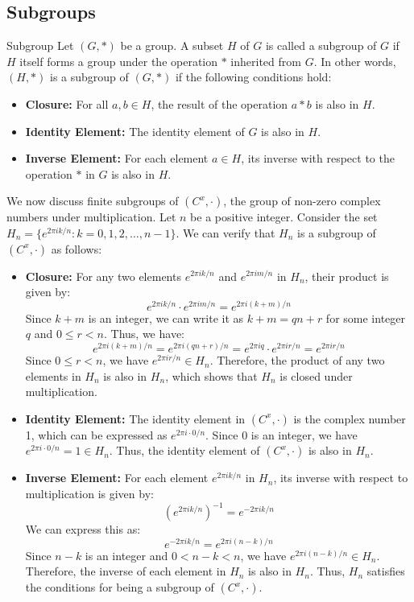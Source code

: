 \documentclass[openany]{book}
\begin{document}
\subsection{Subgroups}
\begin{mydefinition}{Subgroup}
    Let $(G, *)$ be a group. A subset $H$ of $G$ is called a subgroup of $G$ if $H$ itself forms a group under the operation $*$ inherited from $G$. In other words, $(H, *)$ is a subgroup of $(G, *)$ if the following conditions hold:
    \begin{itemize}
        \item \textbf{Closure:} For all $a, b \in H$, the result of the operation $a * b$ is also in $H$.
        \item \textbf{Identity Element:} The identity element of $G$ is also in $H$.
        \item \textbf{Inverse Element:} For each element $a \in H$, its inverse with respect to the operation $*$ in $G$ is also in $H$.
    \end{itemize}
\end{mydefinition}
We now discuss finite subgroups of $(C^x, \cdot)$, the group of non-zero complex numbers under multiplication. Let $n$ be a positive integer. Consider the set $H_n = \{ e^{2\pi i k/n} : k = 0, 1, 2, \ldots, n-1 \}$. We can verify that $H_n$ is a subgroup of $(C^x, \cdot)$ as follows:
\begin{itemize}
    \item \textbf{Closure:} For any two elements $e^{2\pi i k/n}$ and $e^{2\pi i m/n}$ in $H_n$, their product is given by:
    \[
    e^{2\pi i k/n} \cdot e^{2\pi i m/n} = e^{2\pi i (k+m)/n}
    \]
    Since $k+m$ is an integer, we can write it as $k+m = qn + r$ for some integer $q$ and $0 \leq r < n$. Thus, we have:
    \[
    e^{2\pi i (k+m)/n} = e^{2\pi i (qn + r)/n} = e^{2\pi i q} \cdot e^{2\pi i r/n} = e^{2\pi i r/n}
    \]
    Since $0 \leq r < n$, we have $e^{2\pi i r/n} \in H_n$. Therefore, the product of any two elements in $H_n$ is also in $H_n$, which shows that $H_n$ is closed under multiplication.
    \item \textbf{Identity Element:} The identity element in $(C^x, \cdot)$ is the complex number 1, which can be expressed as $e^{2\pi i \cdot 0/n}$. Since $0$ is an integer, we have $e^{2\pi i \cdot 0/n} = 1 \in H_n$. Thus, the identity element of $(C^x, \cdot)$ is also in $H_n$.
    \item \textbf{Inverse Element:} For each element $e^{2\pi i k/n}$ in $H_n$, its inverse with respect to multiplication is given by:
    \[
    (e^{2\pi i k/n})^{-1} = e^{-2\pi i k/n}
    \]
    We can express this as:
    \[
    e^{-2\pi i k/n} = e^{2\pi i (n-k)/n}
    \]
    Since $n-k$ is an integer and $0 < n-k < n$, we have $e^{2\pi i (n-k)/n} \in H_n$. Therefore, the inverse of each element in $H_n$ is also in $H_n$. Thus, $H_n$ satisfies the conditions for being a subgroup of $(C^x, \cdot)$.
\end{itemize}
\end{document}
